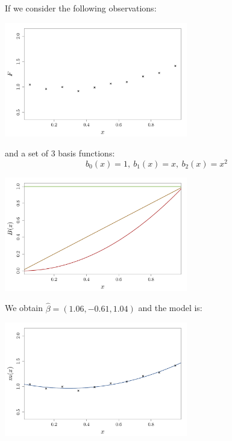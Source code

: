 \documentclass{beamer}
\begin{document}
\begin{frame}{}
\begin{example}
	If we consider the following observations: 
\begin{center}
  \includegraphics[height=5cm]{figures/R/linreg_0}
\end{center}
\end{example}
\end{frame}

\begin{frame}{}
\begin{example}
	and a set of 3 basis functions:
	 $$b_0(x)=1,\ b_1(x)=x,\ b_2(x)=x^2$$
\begin{center}
  \includegraphics[height=5cm]{figures/R/linreg_1}
\end{center}
\end{example}
\end{frame}

\begin{frame}{}
\begin{example}
We obtain $\hat{\beta} = (1.06,-0.61,1.04)$ and the model is:
\begin{center}
  \includegraphics[height=5cm]{figures/R/linreg_2}
\end{center}
\end{example}
\end{frame}
\end{document}
